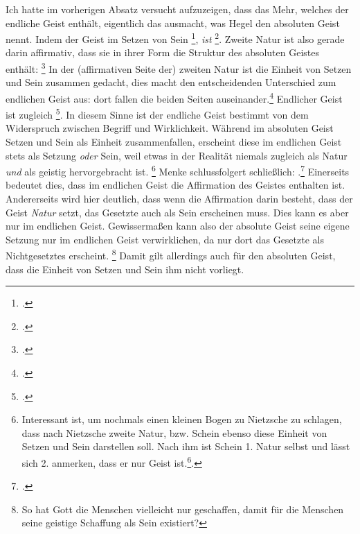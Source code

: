 \documentclass[12pt, a4paper, openany]{report}
\begin{document}
Ich hatte im vorherigen Absatz versucht aufzuzeigen, dass das Mehr, welches der endliche Geist enthält, eigentlich das ausmacht, was Hegel den absoluten Geist nennt.
Indem der Geist im Setzen von Sein \footcite[][§ 384, S. 29]{hegel_enzyklopädie_1969}, \emph{ist} \footcite[][144]{menke_autonomie_2018}.
Zweite Natur ist also gerade darin affirmativ, dass sie in ihrer Form die Struktur des absoluten Geistes enthält: 
\footcite[][§ 384, S. 29]{hegel_enzyklopädie_1969}
In der (affirmativen Seite der) zweiten Natur ist die Einheit von Setzen und Sein zusammen gedacht, dies macht den entscheidenden Unterschied zum endlichen Geist aus: 
dort fallen die beiden Seiten auseinander.\footcite[Vgl.][S. 143 - S. 144]{menke_autonomie_2018}
Endlicher Geist ist zugleich \footcite[][144]{menke_autonomie_2018}.
In diesem Sinne ist der endliche Geist bestimmt von dem Widerspruch zwischen Begriff und Wirklichkeit. 
Während im absoluten Geist Setzen und Sein als Einheit zusammenfallen, erscheint diese im endlichen Geist stets als Setzung \emph{oder} Sein, weil etwas in der Realität niemals zugleich als Natur \emph{und} als geistig hervorgebracht ist.%
\footnote{
    Interessant ist, um nochmals einen kleinen Bogen zu Nietzsche zu schlagen, dass nach Nietzsche zweite Natur, bzw. Schein ebenso diese Einheit von Setzen und Sein darstellen soll.
    Nach ihm ist Schein 1. Natur selbst und lässt sich 2. anmerken, dass er nur Geist ist.\footcite[Vgl.][§ 54, S. 417]{nietzsche_morgenrote_1999}. 
}
Menke schlussfolgert schließlich: 
.\footcite[][144]{menke_autonomie_2018}
Einerseits bedeutet dies, dass im endlichen Geist die Affirmation des Geistes enthalten ist.
Andererseits wird hier deutlich, dass wenn die Affirmation darin besteht, dass der Geist \emph{Natur} setzt, das Gesetzte auch als Sein erscheinen muss.
Dies kann es aber nur im endlichen Geist.
Gewissermaßen kann also der absolute Geist seine eigene Setzung nur im endlichen Geist verwirklichen, da nur dort das Gesetzte als Nichtgesetztes erscheint.
\footnote{
    So hat Gott die Menschen vielleicht nur geschaffen, damit für die Menschen seine geistige Schaffung als Sein existiert?
}
Damit gilt allerdings auch für den absoluten Geist, dass die Einheit von Setzen und Sein ihm nicht vorliegt.
\end{document}
